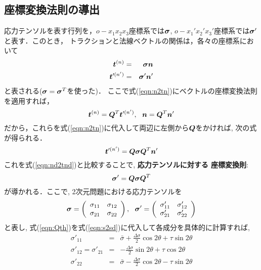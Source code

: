 \documentclass[10pt,a4j]{jbook}
\begin{document}
\subsection{座標変換法則の導出}
応力テンソルを表す行列を，$o-x_1x_2x_3$座標系では$\mbox{\boldmath $\sigma$}$, 
$o-x_1'x_2'x_3'$座標系では$\mbox{\boldmath $\sigma$}'$と表す．このとき，
トラクションと法線ベクトルの関係は，各々の座標系において
\begin{eqnarray}
	\mbox{\boldmath $t$}^{(n)} &=& \mbox{\boldmath $\sigma$}\mbox{\boldmath $n$} 
		\label{eqn:n2tn} \\
	\mbox{\boldmath $t$}'^{(n')} &=& \mbox{\boldmath $\sigma$}'\mbox{\boldmath $n$}'
		\label{eqn:nd2tnd} 
\end{eqnarray}
と表される($\mbox{\boldmath $\sigma$}=\mbox{\boldmath $\sigma$}^T$を使った)．
ここで式(\ref{eqn:n2tn})にベクトルの座標変換法則を適用すれば，
\begin{equation}
	\fat{t}^{(n)}=\fat{Q}^T \fat{t}'^{(n')}, \ \ 
	\fat{n} = \fat{Q}^T \fat{n}'
\end{equation}
だから，これらを式(\ref{eqn:n2tn})に代入して両辺に左側から$\mbox{\boldmath $Q$}$をかければ, 
次の式が得られる．
\begin{equation}
	\mbox{\boldmath $t$}'^{(n')}=\mbox{\boldmath $Q$} \mbox{\boldmath $\sigma$} \mbox{\boldmath $Q$}^T \mbox{\boldmath $n$}'
\end{equation}
これを式(\ref{eqn:nd2tnd})と比較することで, {\bf 応力テンソルに対する
座標変換則}:
\begin{equation}
	\mbox{\boldmath $\sigma$}'=\mbox{\boldmath $Q$}\mbox{\boldmath $\sigma$}\mbox{\boldmath $Q$}^T
	\label{eqn:s2sd}
\end{equation}
が導かれる．ここで, 2次元問題における応力テンソルを
\begin{equation}
	\fat{\sigma}=\left(
		\begin{array}{cc}
		 \sigma_{11} & \sigma_{12} \\
		 \sigma_{21} & \sigma_{22} 
		\end{array}
	\right)
	, \ \ 
	\fat{\sigma}'=\left(
		\begin{array}{cc}
	 \sigma'_{11} & \sigma'_{12} \\
	 \sigma'_{21} & \sigma'_{22} 
	\end{array}
	\right)
\end{equation}
と表し, 式(\ref{eqn:Qth})を式(\ref{eqn:s2sd})に代入して各成分を具体的に計算すれば, 
\begin{eqnarray}
	\sigma'_{11} &=& \bar{\sigma} + \frac{\Delta \sigma}{2} \cos 2\theta + \tau \sin 2\theta
		\label{eqn:s11d} \\
	\sigma'_{12}=\sigma'_{21} &=& - \frac{\Delta \sigma}{2} \sin 2\theta + \tau \cos 2\theta
		\label{eqn:s12d} \\
	\sigma'_{22} &=& \bar{\sigma} - \frac{\Delta \sigma}{2} \cos 2\theta - \tau \sin 2\theta 
		\label{eqn:s22d}
\end{eqnarray}
\end{document}
